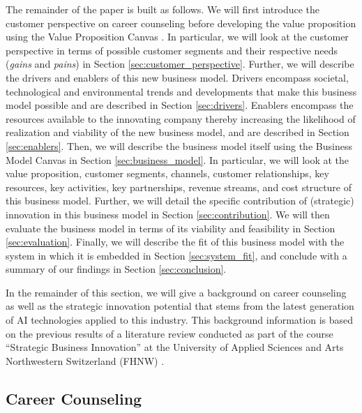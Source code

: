 The remainder of the paper is built as follows. We will first introduce the customer perspective on career counseling
before developing the value proposition using the Value Proposition Canvas \citep{osterwalderValuePropositionDesign2014}.
In particular, we will look at the customer perspective in terms of possible customer segments and their respective needs
(\textit{gains} and \textit{pains}) in Section \ref{sec:customer_perspective}. Further, we will describe the drivers and enablers of
this new business model. Drivers encompass societal, technological and environmental trends and developments that
make this business model possible and are described in Section \ref{sec:drivers}. Enablers encompass 
the resources available to the innovating company thereby increasing the likelihood of realization and viability of the
new business model, and are described in Section \ref{sec:enablers}. Then, we will describe the business model itself
using the Business Model Canvas \citep{osterwalderBusinessModelGeneration2010} in Section \ref{sec:business_model}.
In particular, we will look at the value proposition, customer segments, channels, customer relationships, key
resources, key activities, key partnerships, revenue streams, and cost structure of this business model.
Further, we will detail the specific contribution of (strategic) innovation in this business model in Section
\ref{sec:contribution}. We will then evaluate the business model in terms of its viability and feasibility in Section
\ref{sec:evaluation}. Finally, we will describe the fit of this business model with the system in which it is embedded
in Section \ref{sec:system_fit}, and conclude with a summary of our findings in Section \ref{sec:conclusion}.

In the remainder of this section, we will give a background on career counseling as well as the strategic
innovation potential that stems from the latest generation of AI technologies applied to this industry. This 
background information is based on the previous results of a literature review conducted as part of the course
``Strategic Business Innovation'' at the University of Applied Sciences and Arts Northwestern Switzerland (FHNW)
\citep{kaserAIpoweredCareerCounseling2023}.

\subsection{Career Counseling}

